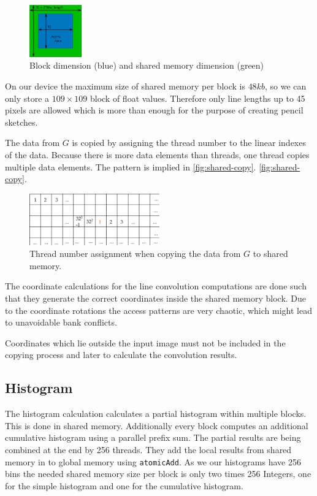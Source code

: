 \begin{figure}[htb]
  \centering
  \includegraphics[width=0.2\textwidth]{images/shared-memory.png}
  \caption{Block dimension (blue) and shared memory dimension (green)}
  \label{fig:shared-memory}
\end{figure}

On our device the maximum size of shared memory per block is $48kb$, so we can
only store a $109\times109$ block of float values. Therefore only line
lengths up to 45 pixels are allowed which is more than enough for the purpose of
creating pencil sketches.

The data from $G$ is copied by assigning the thread number to the linear
indexes of the data. Because there is more data elements than threads, one
thread copies multiple data elements. The pattern is implied in
\autoref{fig:shared-copy}.  \autoref{fig:shared-copy}.
\begin{figure}[htb]
  \centering
  \includegraphics[width=0.5\textwidth]{images/shared-copy.png}
  \caption{Thread number assignment when copying the data from $G$ to shared memory.}
  \label{fig:shared-copy}
\end{figure}

The coordinate calculations for the line convolution computations are done such
that they generate the correct coordinates inside the shared memory block. Due to
the coordinate rotations the access patterns are very chaotic, which might lead
to unavoidable bank conflicts.

Coordinates which lie outside the input image must not be included in the
copying process and later to calculate the convolution results.



\subsection{Histogram}
The histogram calculation calculates a partial histogram within multiple blocks.
This is done in shared memory.  Additionally every block computes an additional
cumulative histogram using a parallel prefix sum. The partial results are being
combined at the end by 256 threads. They add the local results from shared
memory in to global memory using \texttt{atomicAdd}. As we our histograms have
256 bins the needed shared memory size per block is only two times 256 Integers,
one for the simple histogram and one for the cumulative histogram.

